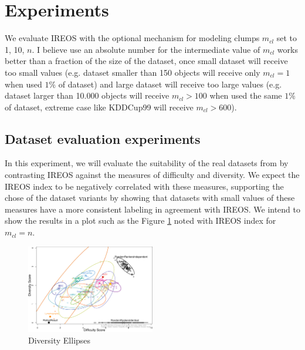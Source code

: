 \documentclass[11pt]{article}
\begin{document}
{\section{Experiments}
We evaluate IREOS with the optional mechanism for modeling clumps $m_{cl}$ set to 1, 10, $n$. I believe use an absolute number for the intermediate value of $m_{cl}$ works better than a fraction of the size of the dataset, once small dataset will receive too small values (e.g. dataset smaller than 150 objects will receive only $m_{cl} = 1$ when used $1\%$ of dataset) and large dataset will receive too large values (e.g. dataset larger than 10.000 objects will receive $m_{cl} > 100$ when used the same $1\%$ of dataset, extreme case like KDDCup99 will receive $m_{cl} > 600$). 

\subsection{Dataset evaluation experiments}
In this experiment, we will evaluate the suitability of the real datasets from \cite{campos2016} by contrasting IREOS against the measures of difficulty and diversity. We expect the IREOS index to be negatively correlated with these measures, supporting the chose of the dataset variants by showing that datasets with small values of these measures have a more consistent labeling in agreement with IREOS. We intend to show the results in a plot such as the Figure \ref{fig:DiversityEllipses} noted with IREOS index for $m_{cl} = n$.
\begin{figure}[h!]
\center
\includegraphics[width=0.5\textwidth]{figs/DiversityEllipses.png}
\captionsetup{justification=centering}
\caption{Diversity Ellipses}
\label{fig:DiversityEllipses}
\end{figure}

}
\end{document}
